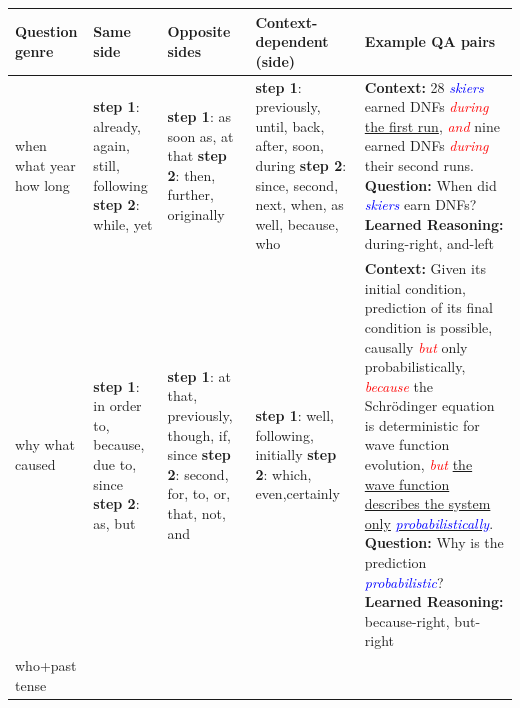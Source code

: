 \begin{table}[t]
\centering
{
	\fontsize{9}{9}\selectfont
  \setlength{\tabcolsep}{1.0mm}
  \renewcommand{\arraystretch}{1.1}
	\begin{tabular}{|p{1.8cm}|p{2.5cm}|p{2.5cm}|p{2.5cm}|p{5.8cm}|}
 	\hline
 	\textbf{Question genre}  & \textbf{Same side}& \textbf{Opposite sides}& \textbf{Context-dependent (side)} &  \textbf{Example QA pairs} \\
 	\hline
 	when \newline what year \newline how long 
 	& \textbf{step 1}: already, again, still, following \newline\textbf{step 2}: while, yet & \textbf{step 1}: as soon as, at that \newline\newline \textbf{step 2}: then, further, originally
 	&\textbf{step 1}: previously, until, back, after, soon, during \newline \textbf{step 2}: since, second, next, when, as well, because, who 
	&  \textbf{Context: }28 \textit{\textcolor{blue}{skiers}} earned DNFs \textit{\textcolor{red}{during}} \underline{the first run}, \textit{\textcolor{red}{and}} nine earned DNFs \textit{\textcolor{red}{during}} their second runs.
  \newline \textbf{Question: }When did \textit{\textcolor{blue}{skiers}} earn DNFs? 
  \newline \textbf{Learned Reasoning: } during-right, and-left\\ 
	\hline
  why \newline what caused 
 &\textbf{step 1}: in order to, because, due to,  since \newline\textbf{step 2}: as, but &\textbf{step 1}: at that, previously, though, if, since \newline \textbf{step 2}: second, for, to, or, that, not, and & \textbf{step 1}: well, following, initially  \newline\newline\textbf{step 2}: which, even,certainly  
  & \textbf{Context: }Given its initial condition, prediction of its final condition is possible, causally \textit{\textcolor{red}{but}} only probabilistically, \textit{\textcolor{red}{because}} the Schrödinger equation is deterministic for wave function evolution, \textit{\textcolor{red}{but}} \underline{the wave function describes the system only} \underline{\textit{\textcolor{blue}{probabilistically}}}.
  \newline \textbf{Question: }Why is the prediction \textit{\textcolor{blue}{probabilistic}}?
  \newline \textbf{Learned Reasoning: }because-right, but-right\\ 
	\hline	
	who+past tense 


\end{tabular}}
\end{table}
